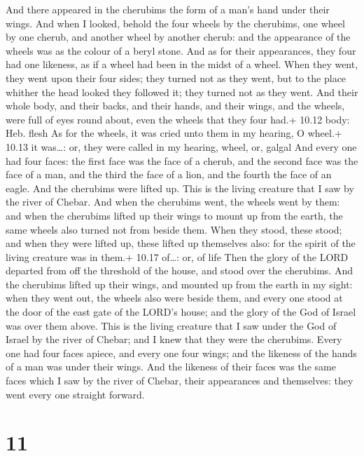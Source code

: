  And there appeared in the cherubims the form of a man's
hand under their wings.  And when I looked, behold the four
wheels by the cherubims, one wheel by one cherub, and another wheel by
another cherub: and the appearance of the wheels was as the colour of a
beryl stone.  And as for their appearances, they four had
one likeness, as if a wheel had been in the midst of a wheel.
 When they went, they went upon their four sides; they
turned not as they went, but to the place whither the head looked they
followed it; they turned not as they went.  And their whole
body, and their backs, and their hands, and their wings, and the wheels,
were full of eyes round about, even the wheels that they four had.+
10.12 body: Heb. flesh  As for the wheels, it was cried
unto them in my hearing, O wheel.+ 10.13 it was\ldots: or, they were
called in my hearing, wheel, or, galgal  And every one had
four faces: the first face was the face of a cherub, and the second face
was the face of a man, and the third the face of a lion, and the fourth
the face of an eagle.  And the cherubims were lifted up.
This is the living creature that I saw by the river of Chebar.
 And when the cherubims went, the wheels went by them: and
when the cherubims lifted up their wings to mount up from the earth, the
same wheels also turned not from beside them.  When they
stood, these stood; and when they were lifted up, these lifted up
themselves also: for the spirit of the living creature was in them.+
10.17 of\ldots: or, of life  Then the glory of the LORD
departed from off the threshold of the house, and stood over the
cherubims.  And the cherubims lifted up their wings, and
mounted up from the earth in my sight: when they went out, the wheels
also were beside them, and every one stood at the door of the east gate
of the LORD's house; and the glory of the God of Israel was over them
above.  This is the living creature that I saw under the
God of Israel by the river of Chebar; and I knew that they were the
cherubims.  Every one had four faces apiece, and every one
four wings; and the likeness of the hands of a man was under their
wings.  And the likeness of their faces was the same faces
which I saw by the river of Chebar, their appearances and themselves:
they went every one straight forward.

\hypertarget{section-10}{%
\section{11}\label{section-10}}

